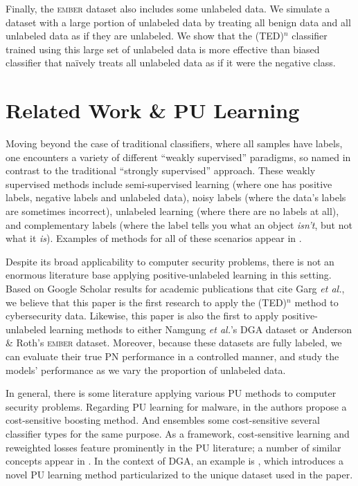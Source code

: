 \documentclass[conference]{IEEEtran}
\begin{document}
    Finally, the \textsc{ember} dataset also includes some unlabeled data. We simulate a dataset with a large portion of unlabeled data by treating all benign data and all unlabeled data as if they are unlabeled. We show that the (TED)${}^n$ classifier trained using this large set of unlabeled data is more effective than biased classifier that na{\"i}vely treats all unlabeled data as if it were the negative class.

\section{Related Work \& PU Learning}
\label{sec:related}

    Moving beyond the case of traditional classifiers, where all samples have labels, one encounters a variety of different ``weakly supervised'' paradigms, so named in contrast to the traditional ``strongly supervised'' approach. These weakly supervised methods include semi-supervised learning (where one has positive labels, negative labels and unlabeled data), noisy labels (where the data's labels are sometimes incorrect), unlabeled learning (where there are no labels at all), and complementary labels (where the label tells you what an object \textit{isn't}, but not what it \textit{is}). Examples of methods for all of these scenarios appear in \cite{mlws}.

    Despite its broad applicability to computer security problems, there is not an enormous literature base applying positive-unlabeled learning in this setting. Based on Google Scholar results for  academic publications that cite Garg \textit{et al.}, we believe that this paper is the first research to apply the (TED)${}^n$ method to cybersecurity data. Likewise, this paper is also the first to apply positive-unlabeled learning methods to either Namgung \textit{et al.}'s DGA dataset or Anderson \& Roth's \textsc{ember} dataset. Moreover, because these datasets are fully labeled, we can evaluate their true PN performance in a controlled manner, and study the models' performance as we vary the proportion of unlabeled data.

    In general, there is some literature applying various PU methods to computer security problems. Regarding PU learning for malware, in \cite{zhang-2019} the authors propose a cost-sensitive boosting method. And \cite{reddy-2020} ensembles some cost-sensitive several classifier types for the same purpose. As a framework, cost-sensitive learning and reweighted losses feature prominently in the PU literature; a number of similar concepts appear in \cite{mlws}. In the context of DGA, an example is \cite{fan-2022}, which introduces a novel PU learning method particularized to the unique dataset used in the paper.
\end{document}

